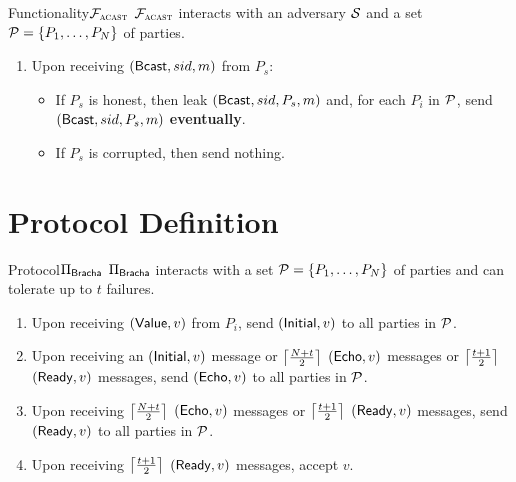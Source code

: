 \documentclass{llncs}
\begin{document}
\begin{boxdef}{Functionality}{$\mathcal{{F}}_{\textsc{acast}}$}
  $\mathcal{{F}}_{\textsc{acast}}$ interacts with an adversary $\mathcal{{S}}$ and a set $\mathcal{{P}} = \{
  P_1, \ldots, P_N \}$ of parties.
  \begin{enumerate}
    \item Upon receiving $({\sf Bcast}, sid, m)$ from $P_s$:
    
    \begin{itemize}
      \item If $P_s$ is honest, then leak $({\sf Bcast}, sid, P_s, m)$ and, for each $P_i$ in $\mathcal{{P}}$, send $({\sf
      Bcast}, sid, P_s, m)$ {\bf eventually}.
      
      \item If $P_s$ is corrupted, then send nothing.
      \end{itemize}
  \end{enumerate}
\end{boxdef}

\begin{comment}
\begin{boxdef}{ILC}{$\Func{acast}$}

\end{boxdef}
\end{comment}

\section{Protocol Definition}

\begin{boxdef}{Protocol}{$\Pi_{\sf Bracha}$}
  $\Pi_{\sf Bracha}$ interacts with a set $\mathcal{{P}} = \{ P_1, \ldots, P_N \}$ of
  parties and can tolerate up to $t$ failures.
  \begin{enumerate}
    \item Upon receiving $({\sf Value}, v)$ from $P_i$, send $({\sf Initial},
  v)$ to all parties in $\mathcal{{P}}$.
  
    \item Upon receiving an $({\sf Initial}, v)$ message or
  $\left\lceil \frac{N+t}{2} \right\rceil$ $({\sf Echo}, v)$ messages or $\left\lceil \frac{t+1}{2} \right\rceil$
  $({\sf Ready}, v)$ messages, send $({\sf Echo}, v)$ to all parties in
  $\mathcal{{P}}$.

    \item Upon receiving $\left\lceil \frac{N+t}{2} \right\rceil$ $({\sf Echo}, v)$ messages or
  $\left\lceil \frac{t+1}{2} \right\rceil$ $({\sf Ready}, v)$ messages, send $({\sf Ready}, v)$ to
  all parties in $\mathcal{{P}}$.

    \item Upon receiving $\left\lceil \frac{t+1}{2} \right\rceil$ $({\sf Ready}, v)$ messages,
    accept $v$.
  \end{enumerate}
\end{boxdef}
\end{document}
